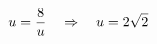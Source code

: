 \documentclass[preview]{standalone}
\begin{document}
\begin{align*}
\special{dvisvgm:raw <g id='unique000'>}u=\frac8u\quad\Rightarrow\quad u=2\sqrt2\special{dvisvgm:raw </g>}
\end{align*}
\end{document}
